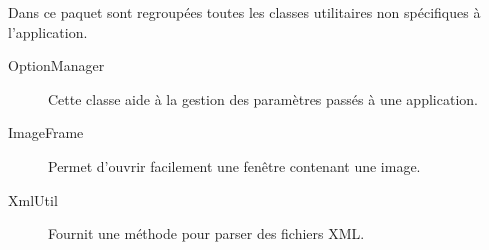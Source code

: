 Dans ce paquet sont regroupées toutes les classes utilitaires non spécifiques à l'application. 

\begin{description}
\item[OptionManager] Cette classe aide à la gestion des paramètres passés à une application.

\item[ImageFrame] Permet d'ouvrir facilement une fenêtre contenant une image.

\item[XmlUtil] Fournit une méthode pour parser des fichiers XML.
\end{description}

